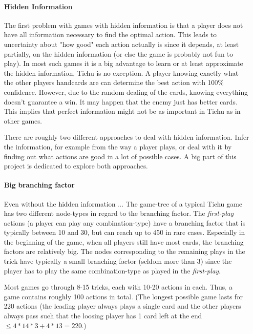 \paragraph{Hidden Information}
\label{par:hiddeninfo}
The first problem with games with hidden information is that a player does not have all information necessary to find the optimal action. This leads to uncertainty about "how good" each action actually is since it depends, at least partially, on the hidden information (or else the game is probably not fun to play). In most such games it is a big advantage to learn or at least approximate the hidden information, Tichu is no exception. %
A player knowing exactly what the other players handcards are can determine the best action with 100\% confidence. However, due to the random dealing of the cards, knowing everything doesn't guarantee a win. It may happen that the enemy just has better cards. This implies that perfect information might not be as important in Tichu as in other games.

There are roughly two different approaches to deal with hidden information. Infer the information, for example from the way a player plays, or deal with it by finding out what actions are good in a lot of possible cases.
A big part of this project is dedicated to explore both approaches.

\paragraph{Big branching factor}
\label{par:branchingfactor}
Even without the hidden information ... %
The game-tree of a typical Tichu game has two different node-types in regard to the branching factor.
The \textit{first-play} actions (a player can play any combination-type) have a branching factor that is typically between 10 and 30, but can reach up to 450 in rare cases. Especially in the beginning of the game, when all players still have most cards, the branching factors are relatively big.
The nodes corresponding to the remaining plays in the trick have typically a small branching factor (seldom more than 3) since the player has to play the same combination-type as played in the \textit{first-play}.

Most games go through 8-15 tricks, each with 10-20 actions in each. Thus, a game contains roughly 100 actions in total. (The longest possible game lasts for 220 actions (the leading player always plays a single card and the other players always pass such that the loosing player has 1 card left at the end $\le 4*14*3 + 4*13 = 220$.)

